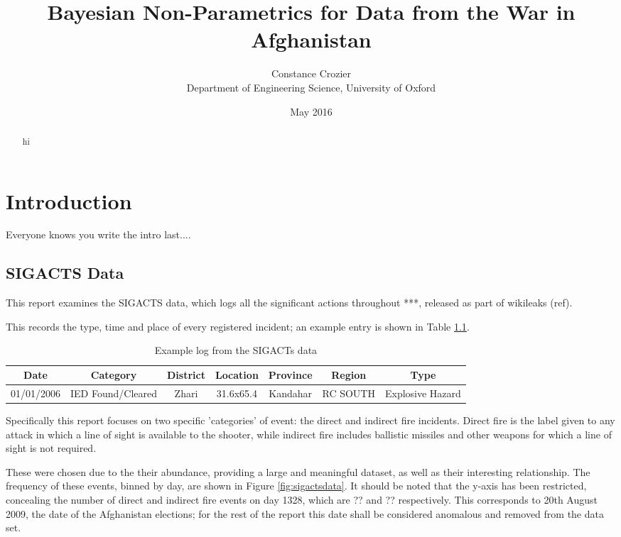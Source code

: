 \documentclass[a4paper,11pt]{report}
\author{Constance Crozier\\Department of Engineering Science, University of Oxford}
\title{Bayesian Non-Parametrics for Data from the War in Afghanistan}
\date{May 2016}
\begin{document}
\maketitle

\begin{abstract}
hi
\end{abstract}

\singlespacing
\pagestyle{plain}
\tableofcontents
\doublespacing

\pagebreak

\chapter{Introduction}
Everyone knows you write the intro last....



\section{SIGACTS Data}
This report examines the SIGACTS data, which logs all the significant actions throughout ***, released as part of wikileaks (ref).

This records the type, time and place of every registered incident; an example entry is shown in Table \ref{tab:sigactseg}. 

\begin{table}[]
\centering
\caption{Example log from the SIGACTs data}
\label{tab:sigactseg}
\begin{tabular}{|c|c|c|c|c|c|c|}
\hline
\bf{Date} & \bf{Category} & \bf{District} & \bf{Location} &  \bf{Province} & \bf{Region} & \bf{Type} \\ \hline
01/01/2006 & IED Found/Cleared & Zhari & 31.6x65.4 & Kandahar & RC SOUTH & Explosive Hazard \\ \hline
\end{tabular}
\end{table}

Specifically this report focuses on two specific 'categories' of event: the direct and indirect fire incidents. Direct fire is the label given to any attack in which a line of sight is available to the shooter, while indirect fire includes ballistic missiles and other weapons for which a line of sight is not required.

These were chosen due to the their abundance, providing a large and meaningful dataset, as well as their interesting relationship. The frequency of these events, binned by day, are shown in Figure \ref{fig:sigactsdata}. It should be noted that the y-axis has been restricted, concealing the number of direct and indirect fire events on day 1328, which are ?? and ?? respectively. This corresponds to 20th August 2009, the date of the Afghanistan elections; for the rest of the report this date shall be considered anomalous and removed from the data set.
\end{document}
